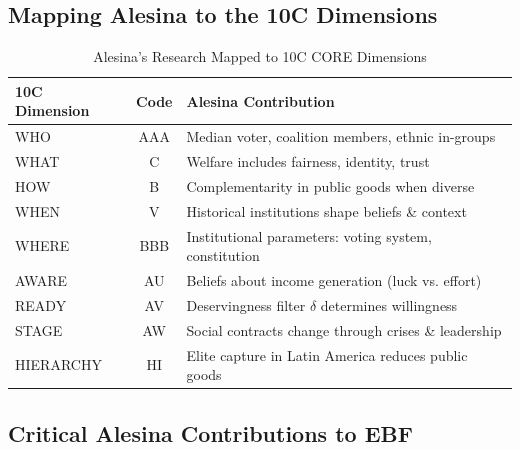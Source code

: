 \subsection{Mapping Alesina to the 10C Dimensions}

\begin{table}[h]
\centering
\caption{Alesina's Research Mapped to 10C CORE Dimensions}
\label{tab:alesina-9c}
\begin{tabular}{lcl}
\toprule
\textbf{10C Dimension} & \textbf{Code} & \textbf{Alesina Contribution} \\
\midrule
WHO & AAA & Median voter, coalition members, ethnic in-groups \\
WHAT & C & Welfare includes fairness, identity, trust \\
HOW & B & Complementarity in public goods when diverse \\
WHEN & V & Historical institutions shape beliefs \& context \\
WHERE & BBB & Institutional parameters: voting system, constitution \\
AWARE & AU & Beliefs about income generation (luck vs. effort) \\
READY & AV & Deservingness filter $\delta$ determines willingness \\
STAGE & AW & Social contracts change through crises \& leadership \\
HIERARCHY & HI & Elite capture in Latin America reduces public goods \\
\bottomrule
\end{tabular}
\end{table}

\subsection{Critical Alesina Contributions to EBF}


